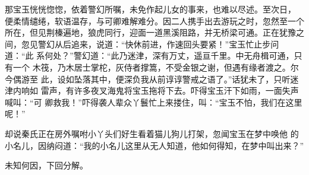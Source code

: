 那宝玉恍恍惚惚，依着警幻所嘱，未免作起儿女的事来，也难以尽述。至次日，
便柔情缱绻，软语温存，与可卿难解难分。因二人携手出去游玩之时，忽然至一个
所在，但见荆榛遍地，狼虎同行，迎面一道黑溪阻路，并无桥梁可通。正在犹豫之
间，忽见警幻从后追来，说道：“快休前进，作速回头要紧！”宝玉忙止步问道：“此
系何处？”警幻道：“此乃迷津，深有万丈，遥亘千里。中无舟楫可通，只有一个
木筏，乃木居士掌柁，灰侍者撑篙，不受金银之谢，但遇有缘者渡之。尔今偶游至
此，设如坠落其中，便深负我从前谆谆警戒之语了。”话犹未了，只听迷津内响如
雷声，有许多夜叉海鬼将宝玉拖将下去。吓得宝玉汗下如雨，一面失声喊叫：“可
卿救我！”吓得袭人辈众丫鬟忙上来搂住，叫：“宝玉不怕，我们在这里呢！”

却说秦氏正在房外嘱咐小丫头们好生看着猫儿狗儿打架，忽闻宝玉在梦中唤他
的小名儿，因纳闷道：“我的小名儿这里从无人知道，他如何得知，在梦中叫出来？”

未知何因，下回分解。